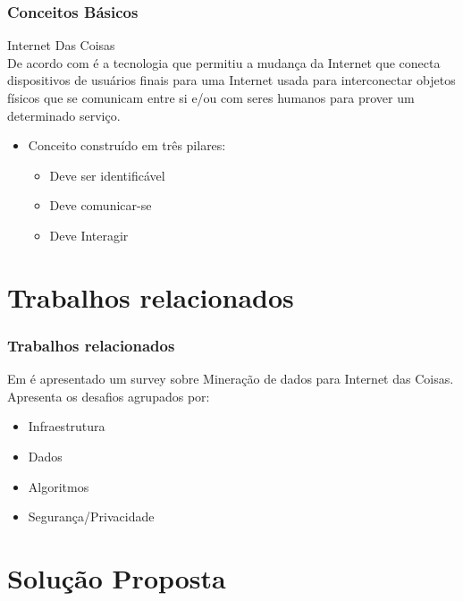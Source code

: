 \documentclass[hyperref={pdfpagelabels=false}]{beamer}
\begin{document}
\begin{frame}
	\frametitle{Conceitos Básicos}
    
    \Large{Internet Das Coisas} \\
    
    \normalsize{De acordo com \cite{000-004}} é a tecnologia que permitiu a mudança da Internet que conecta dispositivos de usuários finais para uma Internet usada para interconectar objetos físicos que se comunicam entre si e/ou com seres humanos para prover um determinado serviço.
    \begin{itemize}
	    \item \normalsize{Conceito construído em três pilares:} \begin{itemize}
		    \item Deve ser identificável
            \item Deve comunicar-se
            \item Deve Interagir
		    \end{itemize}
        
    \end{itemize}

\end{frame}

\section {Trabalhos relacionados}

\begin{frame}
	\frametitle{Trabalhos relacionados}
    
    Em \cite{000-000} é apresentado um survey sobre Mineração de dados para Internet das Coisas. \\
    Apresenta os desafios agrupados por:
	\begin{itemize}
		\item Infraestrutura
        \item Dados
        \item Algoritmos
        \item Segurança/Privacidade
	\end{itemize}

\end{frame}

\section{Solução Proposta}
\end{document}
